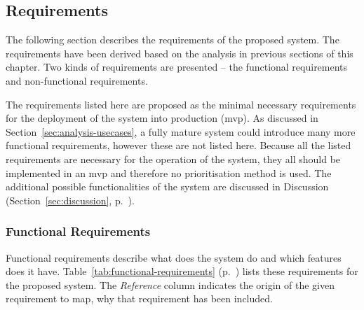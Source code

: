 \subsection{Requirements} \label{sec:analysis-requirements}
The following section describes the requirements of the proposed system. The requirements have been derived based on the analysis in previous sections of this chapter. Two kinds of requirements are presented -- the functional requirements and non-functional requirements. 

The requirements listed here are proposed as the minimal necessary requirements for the deployment of the system into production (\acrlong{mvp}). As discussed in Section~\ref{sec:analysis-usecases}, a fully mature system could introduce many more functional requirements, however these are not listed here. Because all the listed requirements are necessary for the operation of the system, they all should be implemented in an \acrshort{mvp} and therefore no prioritisation method is used. The additional possible functionalities of the system are discussed in Discussion (Section~\ref{sec:discussion}, p.~\pageref{sec:discussion}).

\subsubsection{Functional Requirements} \label{sec:analysis-functionalReqruiements}
Functional requirements describe what does the system do and which features does it have. Table~\ref{tab:functional-requirements} (p.~\pageref{tab:functional-requirements}) lists these requirements for the proposed system. The \textit{Reference} column indicates the origin of the given requirement to map, why that requirement has been included.

